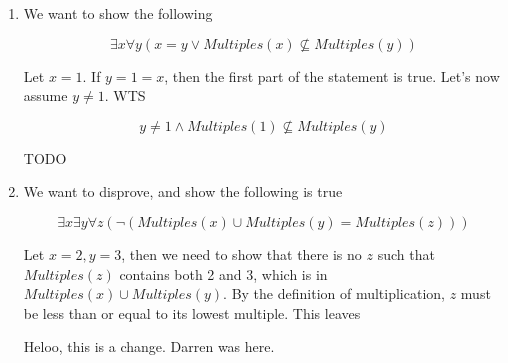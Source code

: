 \documentclass{article}
\newcommand{\mult}{\textit{Multiples}}
\begin{document}
\begin{enumerate}
\begin{enumerate}
		      \item We want to show the following

		            $$
			            \exists x \forall y (x = y \lor \textit{Multiples}(x)
			            \not\subseteq \textit{Multiples}(y))
		            $$

		            Let $x = 1$. If $y = 1 = x$, then the first part of the statement is true. Let's
		            now assume $y \ne 1$. WTS

		            $$
			            y \ne 1 \land
			            \textit{Multiples}(1)
			            \not\subseteq \textit{Multiples}(y)
		            $$

		            TODO

		      \item We want to disprove, and show the following is true

		            $$
			            \exists x \exists y \forall z (\lnot (\mult(x) \cup \mult(y) = \mult(z)))
		            $$

					Let $x=2, y=3$, then we need to show that there is no $z$ such that $\mult(z)$
					contains both 2 and 3, which is in $\mult(x) \cup \mult(y)$. By the definition
					of multiplication, $z$ must be less than or equal to its lowest multiple. This leaves

					Heloo, this is a change.
					Darren was here.
	      \end{enumerate}
\end{enumerate}
\end{document}
